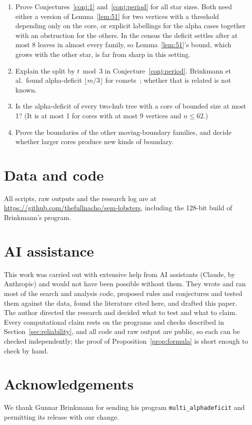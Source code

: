 \documentclass[11pt]{amsart}
\theoremstyle{definition}
\begin{document}
\begin{enumerate}
\item Prove Conjectures~\ref{conj:1} and~\ref{conj:period} for all star sizes. Both need either a version of
  Lemma~\ref{lem:51} for two vertices with a threshold depending only on the core, or explicit labellings for
  the alpha cases together with an obstruction for the others. In the census the deficit settles after at most
  8 leaves in almost every family, so Lemma~\ref{lem:51}'s bound, which grows with the other star, is far from
  sharp in this setting.
\item Explain the split by $t \bmod 3$ in Conjecture~\ref{conj:period}. Brinkmann et al.\ found alpha-deficit
  $\lfloor m/3\rfloor$ for comets~\cite{bcmrs}; whether that is related is not known.
\item Is the alpha-deficit of every two-hub tree with a core of bounded size at most 1? (It is at most 1 for cores
  with at most 9 vertices and $n\le 62$.)
\item Prove the boundaries of the other moving-boundary families, and decide whether larger cores produce new
  kinds of boundary.
\end{enumerate}

\section*{Data and code}
All scripts, raw outputs and the research log are at
\url{https://github.com/thefullnacho/sem-lobsters}, including the 128-bit build of Brinkmann's program.

\section*{AI assistance}
This work was carried out with extensive help from AI assistants (Claude, by Anthropic) and would not have been
possible without them. They wrote and ran most of the search and analysis code, proposed rules and conjectures and
tested them against the data, found the literature cited here, and drafted this paper. The author directed the
research and decided what to test and what to claim. Every computational claim rests on the programs and checks
described in Section~\ref{sec:reliability}, and all code and raw output are public, so each can be checked
independently; the proof of Proposition~\ref{prop:formula} is short enough to check by hand.

\section*{Acknowledgements}
We thank Gunnar Brinkmann for sending his program \texttt{multi\_alphadeficit} and permitting its release with our
change.
\end{document}

